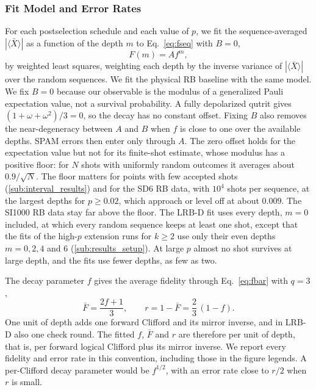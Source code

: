 \subsubsection{Fit Model and Error Rates}
\label{sub:fit_model}

For each postselection schedule and each value of $p$, we fit the sequence-averaged $|\langle \bar{X} \rangle|$ as a function of the depth $m$ to Eq.~\eqref{eq:fseq} with $B = 0$,
\begin{equation}
    F(m) = A f^{m},
    \label{eq:zero_offset_fit}
\end{equation}
by weighted least squares, weighting each depth by the inverse variance of $|\langle \bar{X} \rangle|$ over the random sequences. We fit the physical RB baseline with the same model. We fix $B = 0$ because our observable is the modulus of a generalized Pauli expectation value, not a survival probability. A fully depolarized qutrit gives $(1 + \omega + \omega^2)/3 = 0$, so the decay has no constant offset. Fixing $B$ also removes the near-degeneracy between $A$ and $B$ when $f$ is close to one over the available depths. SPAM errors then enter only through $A$. The zero offset holds for the expectation value but not for its finite-shot estimate, whose modulus has a positive floor: for $N$ shots with uniformly random outcomes it averages about $0.9/\sqrt{N}$. The floor matters for points with few accepted shots (\autoref{sub:interval_results}) and for the SD6 RB data, with $10^4$ shots per sequence, at the largest depths for $p \ge 0.02$, which approach or level off at about $0.009$. The SI1000 RB data stay far above the floor. The LRB-D fit uses every depth, $m = 0$ included, at which every random sequence keeps at least one shot, except that the fits of the high-$p$ extension runs for $k \ge 2$ use only their even depths $m = 0, 2, 4$ and $6$ (\autoref{sub:results_setup}). At large $p$ almost no shot survives at large depth, and the fits use fewer depths, as few as two.

The decay parameter $f$ gives the average fidelity through Eq.~\eqref{eq:fbar} with $q = 3$,
\begin{equation}
    \bar{F} = \frac{2f + 1}{3}, \qquad r = 1 - \bar{F} = \frac{2}{3}\,(1 - f) .
    \label{eq:error_rate}
\end{equation}
One unit of depth adds one forward Clifford and its mirror inverse, and in LRB-D also one check round. The fitted $f$, $\bar{F}$ and $r$ are therefore per unit of depth, that is, per forward logical Clifford plus its mirror inverse. We report every fidelity and error rate in this convention, including those in the figure legends. A per-Clifford decay parameter would be $f^{1/2}$, with an error rate close to $r/2$ when $r$ is small.

